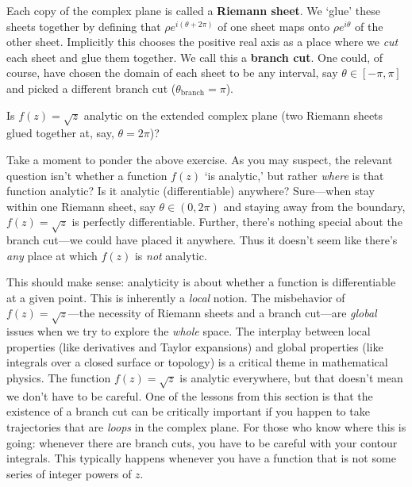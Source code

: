 Each copy of the complex plane is called a \textbf{Riemann sheet}. We `glue' these sheets together by defining that $\rho e^{i(\theta+2\pi)}$ of one sheet maps onto $\rho e^{i\theta}$ of the other sheet. Implicitly this chooses the positive real axis as a place where we \emph{cut} each sheet and glue them together. We call this a \textbf{branch cut}. One could, of course, have chosen the domain of each sheet to be any interval, say $\theta \in [-\pi,\pi]$ and picked a different branch cut ($\theta_\text{branch} = \pi$). 
\begin{exercise}
Is $f(z)=\sqrt{z}$ analytic on the extended complex plane (two Riemann sheets glued together at, say, $\theta=2\pi$)?
\end{exercise}
Take a moment to ponder the above exercise. As you may suspect, the relevant question isn't whether a function $f(z)$ `is analytic,' but rather \emph{where} is that function analytic? Is it analytic (differentiable) anywhere? Sure---when stay within one Riemann sheet, say $\theta\in (0,2\pi)$ and staying away from the boundary, $f(z)=\sqrt{z}$ is perfectly differentiable. Further, there's nothing special about the branch cut---we could have placed it anywhere. Thus it doesn't seem like there's \emph{any} place at which $f(z)$ is \emph{not} analytic. 

This should make sense: analyticity is about whether a function is differentiable at a given point. This is inherently a \emph{local} notion. The misbehavior of $f(z)=\sqrt{z}$---the necessity of Riemann sheets and a branch cut---are \emph{global} issues when we try to explore the \emph{whole} space. The interplay between local properties (like derivatives and Taylor expansions) and global properties (like integrals over a closed surface or topology) is a critical theme in mathematical physics. The function $f(z) = \sqrt{z}$ is analytic everywhere, but that doesn't mean we don't have to be careful. One of the lessons from this section is that the existence of a branch cut can be critically important if you happen to take trajectories that are \emph{loops} in the complex plane. For those who know where this is going: whenever there are branch cuts, you have to be careful with your contour integrals. This typically happens whenever you have a function that is not some series of integer powers of $z$.

